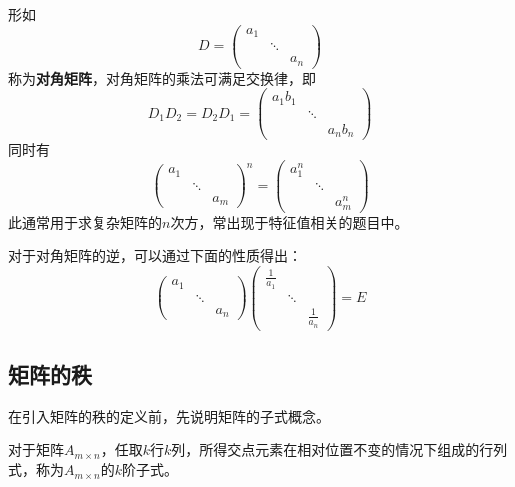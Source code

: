 形如
\[
    D=
    \begin{pmatrix}
        a_1 &        &     \\
            & \ddots &     \\
            &        & a_n
    \end{pmatrix}
\]
称为\textbf{\textsf{对角矩阵}}，对角矩阵的乘法可满足交换律，即
\[
    D_1D_2 = D_2D_1
    =
    \begin{pmatrix}
        a_1b_1 &        &        \\
               & \ddots &        \\
               &        & a_nb_n
    \end{pmatrix}
\]
同时有
\begin{equation}
    \begin{pmatrix}
        a_1 &        &     \\
            & \ddots &     \\
            &        & a_m
    \end{pmatrix}^n
    =
    \begin{pmatrix}
        a_1^n &        &       \\
              & \ddots &       \\
              &        & a_m^n
    \end{pmatrix}
\end{equation}
此通常用于求复杂矩阵的$n$次方，常出现于特征值相关的题目中。

对于对角矩阵的逆，可以通过下面的性质得出：
\begin{equation}
    \begin{pmatrix}
        a_1 &        &     \\
            & \ddots &     \\
            &        & a_n
    \end{pmatrix}
    \begin{pmatrix}
        \frac{1}{a_1} &        &               \\
                      & \ddots &               \\
                      &        & \frac{1}{a_n}
    \end{pmatrix}
    = E
\end{equation}

\subsection{矩阵的秩}
在引入矩阵的秩的定义前，先说明矩阵的子式概念。
\begin{definition}
    对于矩阵$A_{m\times n}$，任取$k$行$k$列，所得交点元素在相对位置不变的情况下组成的行列式，称为$A_{m \times n}$的$k$阶子式。
\end{definition}

